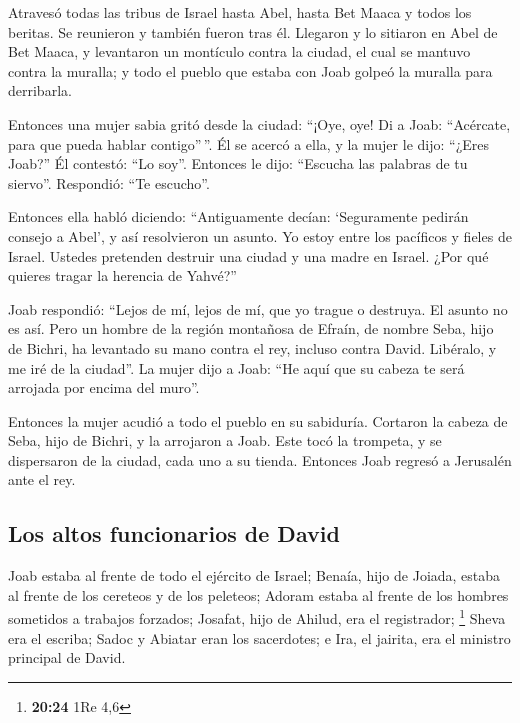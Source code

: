  Atravesó todas las tribus de Israel hasta Abel, hasta
Bet Maaca y todos los beritas. Se reunieron y también fueron tras él.
 Llegaron y lo sitiaron en Abel de Bet Maaca, y
levantaron un montículo contra la ciudad, el cual se mantuvo contra la
muralla; y todo el pueblo que estaba con Joab golpeó la muralla para
derribarla.

 Entonces una mujer sabia gritó desde la ciudad: ``¡Oye,
oye! Di a Joab: ``Acércate, para que pueda hablar contigo''\,''.
 Él se acercó a ella, y la mujer le dijo: ``¿Eres Joab?''
Él contestó: ``Lo soy''. Entonces le dijo: ``Escucha las palabras de tu
siervo''. Respondió: ``Te escucho''.

 Entonces ella habló diciendo: ``Antiguamente decían:
`Seguramente pedirán consejo a Abel', y así resolvieron un asunto.
 Yo estoy entre los pacíficos y fieles de Israel. Ustedes
pretenden destruir una ciudad y una madre en Israel. ¿Por qué quieres
tragar la herencia de Yahvé?''

 Joab respondió: ``Lejos de mí, lejos de mí, que yo
trague o destruya.  El asunto no es así. Pero un hombre
de la región montañosa de Efraín, de nombre Seba, hijo de Bichri, ha
levantado su mano contra el rey, incluso contra David. Libéralo, y me
iré de la ciudad''. La mujer dijo a Joab: ``He aquí que su cabeza te
será arrojada por encima del muro''.

 Entonces la mujer acudió a todo el pueblo en su
sabiduría. Cortaron la cabeza de Seba, hijo de Bichri, y la arrojaron a
Joab. Este tocó la trompeta, y se dispersaron de la ciudad, cada uno a
su tienda. Entonces Joab regresó a Jerusalén ante el rey.

\hypertarget{los-altos-funcionarios-de-david}{%
\subsection{Los altos funcionarios de
David}\label{los-altos-funcionarios-de-david}}

 Joab estaba al frente de todo el ejército de Israel;
Benaía, hijo de Joiada, estaba al frente de los cereteos y de los
peleteos;  Adoram estaba al frente de los hombres
sometidos a trabajos forzados; Josafat, hijo de Ahilud, era el
registrador; \footnote{\textbf{20:24} 1Re 4,6}  Sheva era
el escriba; Sadoc y Abiatar eran los sacerdotes;  e Ira,
el jairita, era el ministro principal de David.

